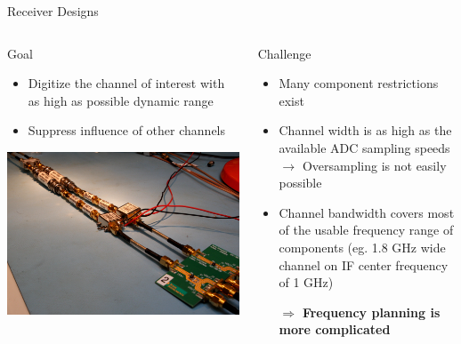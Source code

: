 \documentclass[10pt]{beamer}
\begin{document}
\begin{frame}{Receiver Designs}
  \begin{columns}[T]
    \begin{column}{.5\textwidth}
      \begin{block}{Goal}
        \begin{itemize}
        \item Digitize the channel of interest with as high as possible
          dynamic range
        \item Suppress influence of other channels
        \end{itemize}
      \end{block}
      \includegraphics[width=\textwidth]{pictures/filter}
    \end{column}
    \begin{column}{.5\textwidth}
      \begin{block}{Challenge}
        \begin{itemize}
        \item Many component restrictions exist
        \item Channel width is as high as the available ADC sampling
          speeds $\rightarrow$ Oversampling is not easily possible
        \item Channel bandwidth covers most of the usable frequency
          range of components
          (eg. 1.8 GHz wide channel on IF center frequency of 1 GHz)
        \item[$\Rightarrow$] {\bf Frequency planning is more complicated}
        \end{itemize}
      \end{block}
    \end{column}
  \end{columns}
\end{frame}
\end{document}
